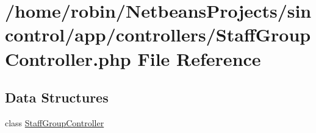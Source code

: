 \hypertarget{_staff_group_controller_8php}{}\section{/home/robin/\+Netbeans\+Projects/sincontrol/app/controllers/\+Staff\+Group\+Controller.php File Reference}
\label{_staff_group_controller_8php}
\subsection*{Data Structures}
\begin{DoxyCompactItemize}
\item 
class \hyperlink{class_staff_group_controller}{Staff\+Group\+Controller}
\end{DoxyCompactItemize}
